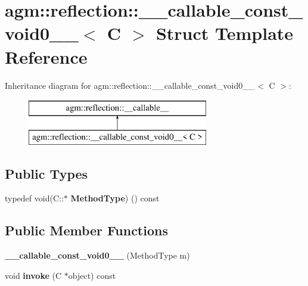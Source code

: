 \hypertarget{structagm_1_1reflection_1_1____callable__const__void0____}{}\section{agm\+:\+:reflection\+:\+:\+\_\+\+\_\+callable\+\_\+const\+\_\+void0\+\_\+\+\_\+$<$ C $>$ Struct Template Reference}
\label{structagm_1_1reflection_1_1____callable__const__void0____}
Inheritance diagram for agm\+:\+:reflection\+:\+:\+\_\+\+\_\+callable\+\_\+const\+\_\+void0\+\_\+\+\_\+$<$ C $>$\+:\begin{figure}[H]
\begin{center}
\leavevmode
\includegraphics[height=2.000000cm]{structagm_1_1reflection_1_1____callable__const__void0____}
\end{center}
\end{figure}
\subsection*{Public Types}
\begin{DoxyCompactItemize}
\item 
typedef void(C\+::$\ast$ {\bfseries Method\+Type}) () const \hypertarget{structagm_1_1reflection_1_1____callable__const__void0_____a07187741ca12fb78be7e6c418c4d258a}{}\label{structagm_1_1reflection_1_1____callable__const__void0_____a07187741ca12fb78be7e6c418c4d258a}

\end{DoxyCompactItemize}
\subsection*{Public Member Functions}
\begin{DoxyCompactItemize}
\item 
{\bfseries \+\_\+\+\_\+callable\+\_\+const\+\_\+void0\+\_\+\+\_\+} (Method\+Type m)\hypertarget{structagm_1_1reflection_1_1____callable__const__void0_____acbdfd6ee31f1dc76993c7adfdc53337a}{}\label{structagm_1_1reflection_1_1____callable__const__void0_____acbdfd6ee31f1dc76993c7adfdc53337a}

\item 
void {\bfseries invoke} (C $\ast$object) const \hypertarget{structagm_1_1reflection_1_1____callable__const__void0_____a7c3eeddbec751052cf87112b23a174fb}{}\label{structagm_1_1reflection_1_1____callable__const__void0_____a7c3eeddbec751052cf87112b23a174fb}

\end{DoxyCompactItemize}

